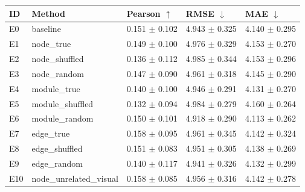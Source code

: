 \begin{tabular}{lllll}
\toprule
ID & Method & Pearson $\uparrow$ & RMSE $\downarrow$ & MAE $\downarrow$ \\
\midrule
E0 & baseline & 0.151 $\pm$ 0.102 & 4.943 $\pm$ 0.325 & 4.140 $\pm$ 0.295 \\
E1 & node_true & 0.149 $\pm$ 0.100 & 4.976 $\pm$ 0.329 & 4.153 $\pm$ 0.270 \\
E2 & node_shuffled & 0.136 $\pm$ 0.112 & 4.985 $\pm$ 0.344 & 4.153 $\pm$ 0.296 \\
E3 & node_random & 0.147 $\pm$ 0.090 & 4.961 $\pm$ 0.318 & 4.145 $\pm$ 0.290 \\
E4 & module_true & 0.140 $\pm$ 0.100 & 4.946 $\pm$ 0.291 & 4.131 $\pm$ 0.270 \\
E5 & module_shuffled & 0.132 $\pm$ 0.094 & 4.984 $\pm$ 0.279 & 4.160 $\pm$ 0.264 \\
E6 & module_random & 0.150 $\pm$ 0.101 & 4.918 $\pm$ 0.290 & 4.113 $\pm$ 0.262 \\
E7 & edge_true & 0.158 $\pm$ 0.095 & 4.961 $\pm$ 0.345 & 4.142 $\pm$ 0.324 \\
E8 & edge_shuffled & 0.151 $\pm$ 0.083 & 4.951 $\pm$ 0.305 & 4.138 $\pm$ 0.269 \\
E9 & edge_random & 0.140 $\pm$ 0.117 & 4.941 $\pm$ 0.326 & 4.132 $\pm$ 0.299 \\
E10 & node_unrelated_visual & 0.158 $\pm$ 0.085 & 4.956 $\pm$ 0.316 & 4.142 $\pm$ 0.278 \\
\bottomrule
\end{tabular}
